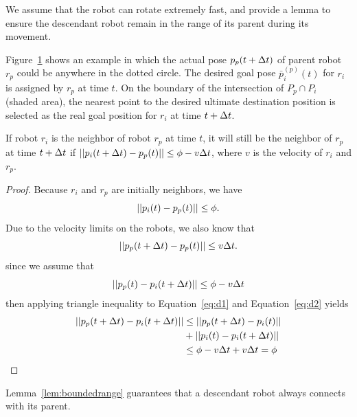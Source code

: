 We assume that the robot can rotate extremely fast, and provide a lemma to ensure the descendant robot remain in the range of its parent during its movement. 

Figure~\ref{fig:boundedrange} shows an example in which the actual
pose $p_p(t+\Delta t)$ of parent robot $r_p$ could be anywhere in the dotted
circle. 
%
The desired goal pose $\bar{p}_i^{(p)}(t)$ for $r_i$ is assigned by $r_p$ at
time $t$.  
%
On the boundary of the intersection of $P_p \cap P_i$ (shaded area),
the nearest point to the desired ultimate destination position is
selected as the real goal position for $r_i$ at time $t+\Delta t$.

\begin{lem}
  \label{lem:boundedrange}
  If robot $r_i$ is the neighbor of robot $r_p$ at time $t$, it will still be the 
  neighbor of $r_p$ at time $t + \Delta t$ if $|| p_i(t+\Delta t) - p_p(t) || \leq \phi -  v\Delta t$, where $v$ is the velocity of $r_i$ and $r_p$. 
\end{lem}

\begin{proof}
Because $r_i$ and $r_p$ are initially neighbors, we have
  \begin{equation}
    || p_i(t) - p_p(t) || \leq \phi.
  \end{equation}
Due to the velocity limits on the robots, we also know that
  \begin{equation}\label{eq:d1}
    || p_p(t+\Delta t)- p_p(t) ||\leq v\Delta t.
  \end{equation}
since we assume that 
  \begin{equation}\label{eq:d2}
    || p_p(t) - p_i(t+\Delta t) || \leq \phi - v\Delta t
  \end{equation}
then applying triangle inequality to Equation~\ref{eq:d1} and Equation~\ref{eq:d2} yields
  \begin{eqnarray*}
  \label{eq:d3}
    || p_p(t+\Delta t) - p_i(t+\Delta t) || & \leq || p_p(t+\Delta t) - p_i(t)|| \\
      & + || p_i(t) - p_i(t+\Delta t)|| \\
      & \leq \phi - v\Delta t + v\Delta t = \phi
  \end{eqnarray*}
\end{proof}
\begin{figure}
    \centering
    
    \label{fig:boundedrange}
\end{figure}

Lemma~\ref{lem:boundedrange} guarantees that a descendant robot always connects with its parent. 

